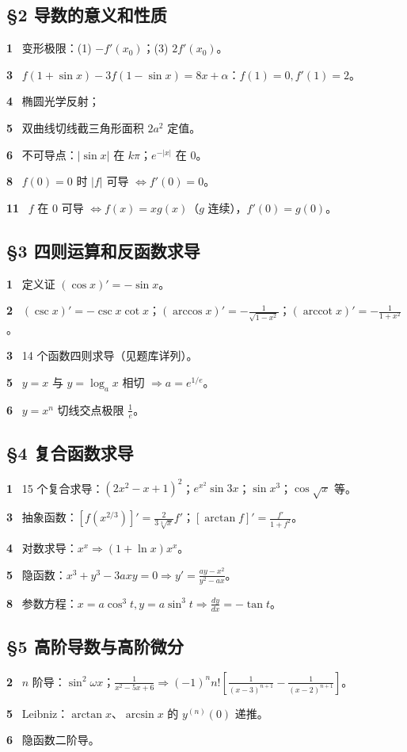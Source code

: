 \documentclass[11pt,a4paper,UTF8]{ctexart}
\newcommand{\qitem}[1]{\par\smallskip\noindent\textbf{#1}\ }
\begin{document}
\subsection*{§2 导数的意义和性质}
\qitem{1} 变形极限：(1) $-f'(x_0)$；(3) $2f'(x_0)$。\\
\qitem{3} $f(1+\sin x)-3f(1-\sin x)=8x+\alpha$：$f(1)=0,f'(1)=2$。\\
\qitem{4} 椭圆光学反射；\qitem{5} 双曲线切线截三角形面积 $2a^2$ 定值。\\
\qitem{6} 不可导点：$|\sin x|$ 在 $k\pi$；$e^{-|x|}$ 在 0。\\
\qitem{8} $f(0)=0$ 时 $|f|$ 可导 $\iff f'(0)=0$。\\
\qitem{11} $f$ 在 0 可导 $\iff f(x)=xg(x)$（$g$ 连续），$f'(0)=g(0)$。

\subsection*{§3 四则运算和反函数求导}
\qitem{1} 定义证 $(\cos x)'=-\sin x$。\\
\qitem{2} $(\csc x)'=-\csc x\cot x$；$(\arccos x)'=-\frac1{\sqrt{1-x^2}}$；$(\operatorname{arccot}x)'=-\frac1{1+x^2}$。\\
\qitem{3} 14 个函数四则求导（见题库详列）。\\
\qitem{5} $y=x$ 与 $y=\log_a x$ 相切 $\Rightarrow a=e^{1/e}$。\qitem{6} $y=x^n$ 切线交点极限 $\frac1e$。

\subsection*{§4 复合函数求导}
\qitem{1} 15 个复合求导：$(2x^2-x+1)^2$；$e^{x^2}\sin3x$；$\sin x^3$；$\cos\sqrt x$ 等。\\
\qitem{3} 抽象函数：$[f(x^{2/3})]'=\frac2{3\sqrt[3]x}f'$；$[\arctan f]'=\frac{f'}{1+f^2}$。\\
\qitem{4} 对数求导：$x^x\Rightarrow(1+\ln x)x^x$。\\
\qitem{5} 隐函数：$x^3+y^3-3axy=0\Rightarrow y'=\frac{ay-x^2}{y^2-ax}$。\\
\qitem{8} 参数方程：$x=a\cos^3t,y=a\sin^3t\Rightarrow\frac{dy}{dx}=-\tan t$。

\subsection*{§5 高阶导数与高阶微分}
\qitem{2} $n$ 阶导：$\sin^2\omega x$；$\frac1{x^2-5x+6}\Rightarrow(-1)^nn![\frac1{(x-3)^{n+1}}-\frac1{(x-2)^{n+1}}]$。\\
\qitem{5} Leibniz：$\arctan x$、$\arcsin x$ 的 $y^{(n)}(0)$ 递推。\\
\qitem{6} 隐函数二阶导。
\end{document}
